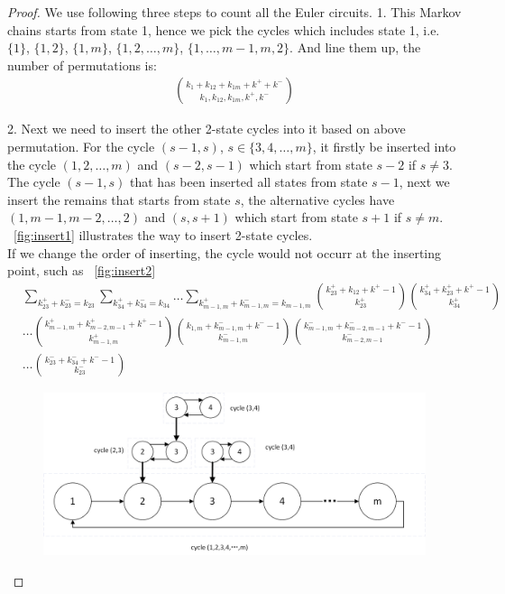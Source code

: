 \documentclass[11pt,en,cite=authoryear]{elegantpaper}
\begin{document}
\begin{proof}
    We use following three steps to count all the Euler circuits.
    1. This Markov chains starts from state 1, hence we pick the cycles which includes state 1, i.e. $\{1\}$, $\{1, 2\}$, $\{1, m\}$, $\{1, 2, \dots, m\}$, $\{1, \dots, m-1,m, 2\}$. And line them up, the number of permutations is:
    \begin{align*}
        \binom{k_{1}+k_{12}+k_{1m}+k^{+}+k^{-}}{k_{1}, k_{12}, k_{1m}, k^{+}, k^{-}}
    \end{align*}
    
    2. Next we need to insert the other 2-state cycles into it based on above permutation.
    For the cycle $(s-1, s)$, $s \in \{3, 4, \dots , m\}$, it firstly be inserted into the cycle $(1, 2, \dots, m)$ and $(s-2, s-1)$ which start from state $s-2$ if $s \neq 3$.
    The cycle $(s-1, s)$ that has been inserted all states from state $s-1$, next we insert the remains that starts from state $s$, the  alternative cycles have $(1, m-1,m-2, \dots, 2)$ and $(s, s+1)$ which start from state $s+1$ if $s \neq m$. ~\ref{fig:insert1} illustrates the way to insert 2-state cycles.\\
    If we change the order of inserting, the cycle would not occurr at the inserting point, such as ~\ref{fig:insert2}
    \begin{align*}
        &\sum_{k_{23}^{+}+k_{23}^{-}=k_{23}} \sum_{k_{34}^{+}+k_{34}^{-}=k_{34}}
        \dots \sum_{k_{m-1,m}^{+}+k_{m-1,m}^{-}=k_{m-1,m}}
        \binom{k_{23}^{+}+k_{12}+k^{+}-1}{k_{23}^{+}} \binom{k_{34}^{+}+k_{23}^{+}+k^{+}-1}{k_{34}^{+}} \\
        &\dots \binom{k_{m-1, m}^{+}+ k^{+}_{m-2, m-1} + k^{+}  -1}{k_{m-1, m}^{+}} \binom{k_{1, m} + k_{m-1, m}^{-} + k^{-} -1}{k_{m-1, m}^{-}} \binom{k_{m-1, m}^{-} + k_{m-2, m-1}^{-} + k^{-} - 1}{k_{m-2, m-1}^{-}} \\
        &\dots \binom{k_{23}^{-} + k_{34}^{-} + k^{-} - 1}{k_{23}^{-}}
    \end{align*}
    \begin{figure}[h]  
        \centering
        \includegraphics[scale=0.5]{insert1.png}

\end{figure}
\end{proof}
\end{document}
